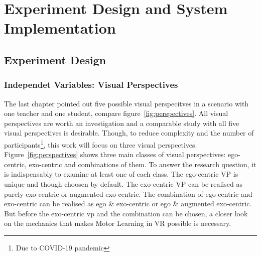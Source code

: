 \chapter{Experiment Design and System Implementation}
\label{chapter:studysetting_conduction}
\section{Experiment Design}
\label{section:study}

\subsection{Independet Variables: Visual Perspectives}
The last chapter pointed out five possible visual perspecitves in a scenario with one teacher and one student, compare figure~\ref{fig:perspectives}. All visual perspectives are worth an investigation and a comparable study with all five visual perspectives is desirable. Though, to reduce complexity and the number of participants\footnote{Due to COVID-19 pandemic}, this work will focus on three visual perspectives.\\
Figure~\ref{fig:perspectives} shows three main classes of visual perspectives: ego-centric, exo-centric and combinations of them. To answer the research question, it is indispensably to examine at least one of each class. The ego-centric VP is unique and though choosen by default. The exo-centric VP can be realised as purely exo-centric or augmented exo-centric. The combination of ego-centric and exo-centric can be realised as ego \& exo-centric or ego \& augmented exo-centric. But before the exo-centric vp and the combination can be chosen, a closer look on the mechanics that makes Motor Learning in VR possible is necessary.

